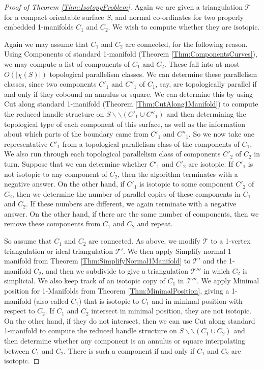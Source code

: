 \documentclass[oneside]{amsart}
\numberwithin{equation}{section}
\theoremstyle{plain}
\theoremstyle{definition}
\newcommand{\calT}{{\mathcal{T}}}
\newcommand{\cut}{\backslash\backslash}
\begin{document}
\begin{proof}[Proof of Theorem \ref{Thm:IsotopyProblem}]
Again we are given a triangulation $\calT$ for a compact orientable surface $S$, and normal co-ordinates for two properly embedded 1-manifolds $C_1$ and $C_2$. We wish to compute whether they are isotopic.

Again we may assume that $C_1$ and $C_2$ are connected, for the following reason. Using {\sc Components of standard 1-manifold} (Theorem \ref{Thm:ComponentsCurves}), we may compute a list of components of $C_1$ and $C_2$. These fall into at most $O(|\chi(S)|)$ topological parallelism classes. We can determine these parallelism classes, since two components $C'_1$ and $C''_1$ of $C_1$, say, are topologically parallel if and only if they cobound an annulus or square. We can determine this by using {\sc Cut along standard 1-manifold} (Theorem \ref{Thm:CutAlong1Manifold}) to compute the reduced handle structure on $S \cut (C'_1 \cup C''_1)$ and then determining the topological type of each component of this surface, as well as the information about which parts of the boundary came from $C'_1$ and $C''_1$. So we now take one representative $C'_1$ from a topological parallelism class of the components of $C_1$. We also run through each topological parallelism class of components $C'_2$ of $C_2$ in turn. Suppose that we can determine whether $C'_1$ and $C'_2$ are isotopic. If $C'_1$ is not isotopic to any component of $C_2$, then the algorithm terminates with a negative answer. On the other hand, if $C'_1$ is isotopic to some component $C'_2$ of $C_2$, then we determine the number of parallel copies of these components in $C_1$ and $C_2$. If these numbers are different, we again terminate with a negative answer. On the other hand, if there are the same number of components, then we remove these components from $C_1$ and $C_2$ and repeat.

So assume that $C_1$ and $C_2$ are connected.
As above, we modify $\mathcal{T}$ to a 1-vertex triangulation or ideal triangulation $\calT'$. We then apply {\sc Simplify normal 1-manifold} from Theorem \ref{Thm:SimplifyNormal1Manifold} to $\calT'$ and the 1-manifold $C_2$, and then we subdivide to give a triangulation $\calT'''$ in which $C_2$ is simplicial. We also keep track of an isotopic copy of $C_1$ in $\calT'''$. We apply {\sc Minimal position for 1-Manifolds} from Theorem \ref{Thm:MinimalPosition}, giving a 1-manifold (also called $C_1$) that is isotopic to $C_1$ and in minimal position with respect to $C_2$. If $C_1$ and $C_2$ intersect in minimal position, they are not isotopic. On the other hand, if they do not intersect, then we can use {\sc Cut along standard 1-manifold} to compute the reduced handle structure on $S \cut (C_1 \cup C_2)$ and then determine whether any component is an annulus or square interpolating between $C_1$ and $C_2$. There is such a component if and only if $C_1$ and $C_2$ are isotopic.
\end{proof}
\end{document}
